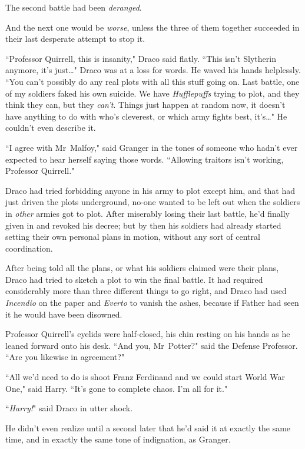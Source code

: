 The second battle had been \emph{deranged}.

And the next one would be \emph{worse}, unless the three of them together succeeded in their last desperate attempt to stop it.

``Professor Quirrell, this is insanity," Draco said flatly. ``This isn't Slytherin anymore, it's just{\ldots}" Draco was at a loss for words. He waved his hands helplessly. ``You can't possibly do any real plots with all this stuff going on. Last battle, one of my soldiers faked his own suicide. We have \emph{Hufflepuffs} trying to plot, and they think they can, but they \emph{can't}. Things just happen at random now, it doesn't have anything to do with who's cleverest, or which army fights best, it's{\ldots}" He couldn't even describe it.

``I agree with Mr~Malfoy," said Granger in the tones of someone who hadn't ever expected to hear herself saying those words. ``Allowing traitors isn't working, Professor Quirrell."

Draco had tried forbidding anyone in his army to plot except him, and that had just driven the plots underground, no-one wanted to be left out when the soldiers in \emph{other} armies got to plot. After miserably losing their last battle, he'd finally given in and revoked his decree; but by then his soldiers had already started setting their own personal plans in motion, without any sort of central coordination.

After being told all the plans, or what his soldiers claimed were their plans, Draco had tried to sketch a plot to win the final battle. It had required considerably more than three different things to go right, and Draco had used \emph{Incendio} on the paper and \emph{Everto} to vanish the ashes, because if Father had seen it he would have been disowned.

Professor Quirrell's eyelids were half-closed, his chin resting on his hands as he leaned forward onto his desk. ``And you, Mr~Potter?" said the Defense Professor. ``Are you likewise in agreement?"

``All we'd need to do is shoot Franz Ferdinand and we could start World War One," said Harry. ``It's gone to complete chaos. I'm all for it."

``\emph{Harry!}" said Draco in utter shock.

He didn't even realize until a second later that he'd said it at exactly the same time, and in exactly the same tone of indignation, as Granger.

